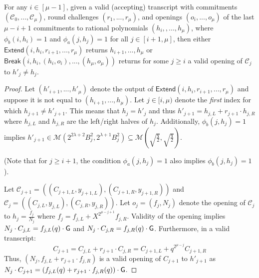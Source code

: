 \begin{subclaim} 
 For any $i \in [\mu-1]$, given a valid (accepting) transcript with commitments $(\mathcal{C}_0,...,\mathcal{C}_\mu)$, round challenges $(r_1,...,r_\mu)$, and openings $(o_i,...,o_\mu)$ of the last $\mu-i + 1$ commitments to rational polynomials $(h_i,,...,h_\mu)$, where $\phi_b(i, h_i) = 1$ and $\phi_a(j, h_j) = 1$ for all $j \in [i+1,\mu]$, then either $\textsf{Extend}(i, h_i, r_{i+1},...,r_\mu)$ returns $h_{i+1},...,h_{\mu}$ or $\textsf{Break}(i, h_i, (h_i, o_i),...,(h_\mu, o_\mu))$ returns for some $j \geq i$ a valid opening of $\mathcal{C}_j$ to $h'_j \neq h_j$.  %
\end{subclaim} 
\begin{proof} 
Let $(h'_{i+1},...,h'_\mu)$ denote the output of $\textsf{Extend}(i, h_i, r_{i+1},...,r_\mu)$ and suppose it is not equal to $(h_{i+1},..., h_\mu)$. Let $j \in [i, \mu)$ denote the \emph{first} index for which $h_{j+1} \neq h'_{j+1}$. This means that $h_j = h'_j$ and thus $h'_{j+1} = h_{j, L} + r_{j+1} \cdot h_{j, R}$ where $h_{j, L}$ and $h_{j, R}$ are the left/right halves of $h_{j}$. Additionally, $\phi_b(j, h_{j}) = 1$ implies $h'_{j+1} \in \mathcal{M}(2^{2\lambda + 2} B_{j}^2, 2^{\lambda + 1} B_{j}^2) \subseteq \mathcal{M}(\sqrt{\frac{q}{2}}, \sqrt{\frac{q}{2}})$. 

(Note that for $j \geq i+1$, the condition $\phi_a(j, h_j) = 1$ also implies $\phi_b(j, h_j) = 1$).

Let $\mathcal{C}_{j+1} = ((C_{j+1, L}, y_{j+1,L}), (C_{j+1,R}, y_{j+1,R}))$ and $\mathcal{C}_{j} = ((C_{j,L}, y_{j,L}), (C_{j,R},y_{j,R}))$. 
Let $o_j = (f_j, N_{j})$ denote the opening of $\mathcal{C}_{j}$ to $h_j =\frac{f_j}{N_{j}}$ where $f_{j} = f_{j, L} + X^{2^{\mu - j + 1}} f_{j, R}$. Validity of the opening implies $N_{j} \cdot C_{j,L} = f_{j,L}(q) \cdot \mathsf{G}$ and $N_{j} \cdot C_{j,R} = f_{j,R}(q) \cdot \mathsf{G}$. Furthermore, in a valid transcript: 
 $$C_{j+1}  = C_{j, L} + r_{j+1} \cdot C_{j,R} =  C_{j+1,L} + q^{2^{\mu - j}} C_{j+1,R}$$
  Thus, $(N_{j}, f_{j,L} + r_{j+1} \cdot f_{j, R})$ is a valid opening of $C_{j+1}$ to $h'_{j+1}$ as $N_{j} \cdot C_{j+1} = (f_{j, L}(q) + r_{j+1} \cdot f_{j, R}(q)) \cdot \mathsf{G}$. 

\end{proof} 

